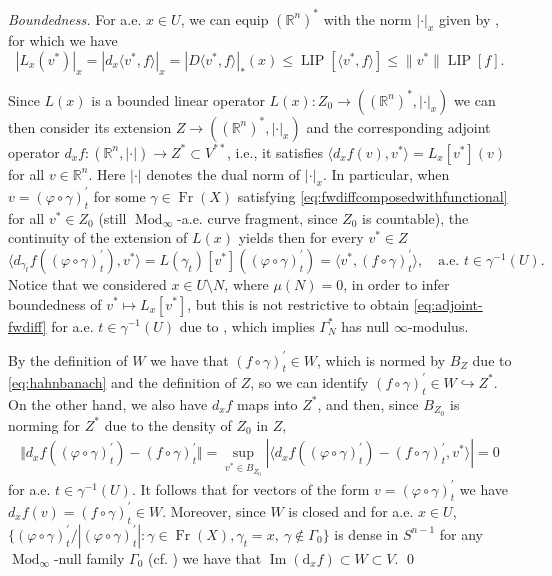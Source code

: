 \documentclass{amsart}
\numberwithin{equation}{section}
\newcommand{\R}{\mathbb{R}}
\newcommand{\Mod}{\operatorname{Mod}}
\newcommand{\LIP}{\operatorname{LIP}}
\newcommand{\Fr}{\operatorname{Fr}}
\newcommand{\ud}{\mathrm {d}}
\begin{document}
\textit{Boundedness.} For a.e. $x\in U$, we can equip $(\R^n)^\ast$ with the norm $|\cdot|_x$ given by \cite[Theorem 1.2.]{tsd24}, for which we have
\[
|L_x(v^\ast)|_x=|d_x\langle v^*, f\rangle|_x = |D\langle v^*, f\rangle|_\ast(x)\leq \LIP[\langle v^*, f\rangle]\leq \|v^\ast\|\LIP[f].
\]



Since $L(x)$ is a bounded linear operator $L(x):Z_0\rightarrow ((\R^n )^*,|\cdot|_x )$ we can then consider its extension $Z\rightarrow ((\R^n )^*,|\cdot|_x)$ and the corresponding adjoint operator $d_xf:(\R^n,\vert\cdot\vert )\rightarrow Z^*\subset V^{**}$, i.e., it satisfies $\langle d_xf(v),v^*\rangle =L_x[v^*](v)$ for all $v\in \R^n$. Here $|\cdot |$ denotes the dual norm of $|\cdot|_x$. In particular, when $v=(\varphi\circ\gamma)^\prime_t$ for some $\gamma\in\Fr (X)$ satisfying \eqref{eq:fwdiffcomposedwithfunctional} for all $v^*\in Z_0$ (still $\Mod_\infty$-a.e. curve fragment, since $Z_0$ is countable), the continuity of the extension of $L(x)$ yields then for every $v^*\in Z$
\begin{equation}\label{eq:adjoint-fwdiff}
\langle d_{\gamma_t}f((\varphi\circ\gamma )_t^\prime ),v^*\rangle =L(\gamma_t)[v^*]((\varphi\circ\gamma )_t^\prime )=\langle v^*, (f\circ \gamma)_t^\prime  \rangle ,\quad \mbox{a.e. } t\in \gamma^{-1}(U).
\end{equation}
Notice that we considered $x\in U\setminus N$, where $\mu (N)=0$, in order to infer boundedness of $v^*\mapsto L_x[v^*]$, but this is not restrictive to obtain \eqref{eq:adjoint-fwdiff} for a.e. $t\in\gamma^{-1}(U)$ due to \cite[Lemma 2.7]{tsd24}, which implies $\Gamma_N^*$ has null $\infty$-modulus.

By the definition of $W$ we have that $(f\circ\gamma )^\prime_t\in W$, which is normed by  $B_Z$ due to \eqref{eq:hahnbanach} and the definition of $Z$, so we can  identify $(f\circ\gamma )^\prime_t\in W\hookrightarrow Z^*$. On the other hand, we also have $d_xf$ maps into $Z^*$, and then, since $B_{Z_0}$ is norming for $Z^*$ due to the density of $Z_0$ in $Z$, 
\begin{align*}\Vert d_xf((\varphi\circ\gamma )^\prime_t)-(f\circ\gamma )^\prime_t\Vert =\sup_{v^*\in B_{Z_0}}| \langle d_xf((\varphi\circ\gamma )^\prime_t)-(f\circ\gamma )^\prime_t,v^*\rangle | =0
\end{align*}
for a.e. $t\in\gamma^{-1}(U)$. It follows that for vectors of the form $v=(\varphi\circ\gamma)^\prime_t$ we have $d_xf(v)=(f\circ\gamma)^\prime_t\in W$. 
Moreover, since $W$ is closed and for a.e. $x\in U$, $\{ (\varphi\circ\gamma)^\prime_t/|(\varphi\circ\gamma)^\prime_t|:\gamma\in \Fr (X), \gamma_t=x,\ \gamma\notin \Gamma_0\}$ is dense in $S^{n-1}$ for any $\Mod_\infty$-null family $\Gamma_0$ (cf. \cite[Theorem 6.4]{tsd24}) we have that $\operatorname{Im}(\ud_xf)\subset W\subset V$. \qed
\end{document}
